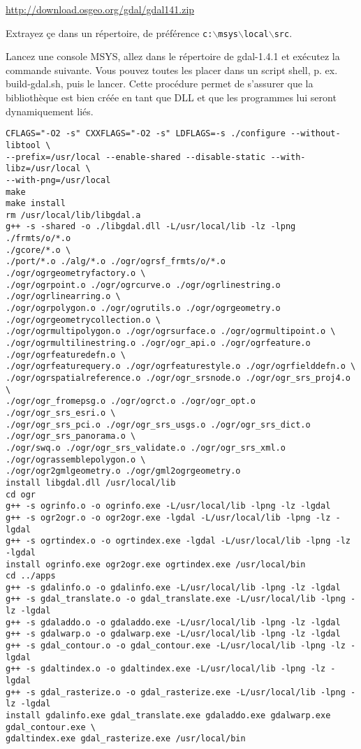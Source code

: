 \url{http://download.osgeo.org/gdal/gdal141.zip}

Extrayez \c{c}e dans un r\'epertoire, de pr\'ef\'erence \texttt{c:$\backslash$msys$\backslash$local$\backslash$src}.

Lancez une console MSYS, allez dans le r\'epertoire de gdal-1.4.1 et ex\'ecutez la commande suivante. Vous pouvez toutes les placer dans un script shell, p. ex. build-gdal.sh, puis le lancer. Cette proc\'edure permet de s'assurer que la biblioth\`eque est bien cr\'e\'ee en tant que DLL et que les programmes lui seront dynamiquement li\'es.

\begin{verbatim}
CFLAGS="-O2 -s" CXXFLAGS="-O2 -s" LDFLAGS=-s ./configure --without-libtool \
--prefix=/usr/local --enable-shared --disable-static --with-libz=/usr/local \
--with-png=/usr/local
make
make install
rm /usr/local/lib/libgdal.a
g++ -s -shared -o ./libgdal.dll -L/usr/local/lib -lz -lpng ./frmts/o/*.o
./gcore/*.o \
./port/*.o ./alg/*.o ./ogr/ogrsf_frmts/o/*.o ./ogr/ogrgeometryfactory.o \
./ogr/ogrpoint.o ./ogr/ogrcurve.o ./ogr/ogrlinestring.o ./ogr/ogrlinearring.o \
./ogr/ogrpolygon.o ./ogr/ogrutils.o ./ogr/ogrgeometry.o
./ogr/ogrgeometrycollection.o \
./ogr/ogrmultipolygon.o ./ogr/ogrsurface.o ./ogr/ogrmultipoint.o \
./ogr/ogrmultilinestring.o ./ogr/ogr_api.o ./ogr/ogrfeature.o
./ogr/ogrfeaturedefn.o \ 
./ogr/ogrfeaturequery.o ./ogr/ogrfeaturestyle.o ./ogr/ogrfielddefn.o \
./ogr/ogrspatialreference.o ./ogr/ogr_srsnode.o ./ogr/ogr_srs_proj4.o \
./ogr/ogr_fromepsg.o ./ogr/ogrct.o ./ogr/ogr_opt.o ./ogr/ogr_srs_esri.o \
./ogr/ogr_srs_pci.o ./ogr/ogr_srs_usgs.o ./ogr/ogr_srs_dict.o
./ogr/ogr_srs_panorama.o \
./ogr/swq.o ./ogr/ogr_srs_validate.o ./ogr/ogr_srs_xml.o
./ogr/ograssemblepolygon.o \
./ogr/ogr2gmlgeometry.o ./ogr/gml2ogrgeometry.o
install libgdal.dll /usr/local/lib
cd ogr
g++ -s ogrinfo.o -o ogrinfo.exe -L/usr/local/lib -lpng -lz -lgdal
g++ -s ogr2ogr.o -o ogr2ogr.exe -lgdal -L/usr/local/lib -lpng -lz -lgdal
g++ -s ogrtindex.o -o ogrtindex.exe -lgdal -L/usr/local/lib -lpng -lz -lgdal
install ogrinfo.exe ogr2ogr.exe ogrtindex.exe /usr/local/bin
cd ../apps
g++ -s gdalinfo.o -o gdalinfo.exe -L/usr/local/lib -lpng -lz -lgdal
g++ -s gdal_translate.o -o gdal_translate.exe -L/usr/local/lib -lpng -lz -lgdal
g++ -s gdaladdo.o -o gdaladdo.exe -L/usr/local/lib -lpng -lz -lgdal
g++ -s gdalwarp.o -o gdalwarp.exe -L/usr/local/lib -lpng -lz -lgdal
g++ -s gdal_contour.o -o gdal_contour.exe -L/usr/local/lib -lpng -lz -lgdal
g++ -s gdaltindex.o -o gdaltindex.exe -L/usr/local/lib -lpng -lz -lgdal
g++ -s gdal_rasterize.o -o gdal_rasterize.exe -L/usr/local/lib -lpng -lz -lgdal
install gdalinfo.exe gdal_translate.exe gdaladdo.exe gdalwarp.exe
gdal_contour.exe \
gdaltindex.exe gdal_rasterize.exe /usr/local/bin

\end{verbatim}

